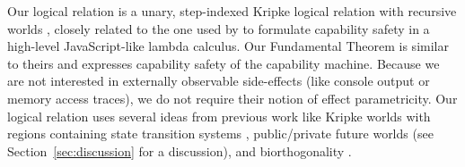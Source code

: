 \documentclass[format=acmsmall, review=true, screen=true]{acmart}
\renewcommand{\sectionname}{Section}
\newcommand\lau[1]{{\color{purple} \sf \footnotesize {LS: #1}}\\}
\renewcommand\lau[1]{}
\begin{document}

\lau{Reviewer C, esop, would like a better comparison with \citet{Devriese:2016ObjCap} (but also admits that they did not follow the below discussion).}
Our logical relation is a unary, step-indexed Kripke logical relation with
recursive worlds
\citep{pitts_operational_1998,Appel:2001:IMR:504709.504712,Ahmed2004semantics,Birkedal:2011:SKM:1926385.1926401},
closely related to the one used by \citet{Devriese:2016ObjCap} to formulate
capability safety in a high-level JavaScript-like lambda calculus. Our
Fundamental Theorem is similar to theirs and expresses capability safety of the
capability machine. Because we are not interested in externally observable
side-effects (like console output or memory access traces), we do not require
their notion of effect parametricity. Our logical relation uses several ideas
from previous work like Kripke worlds with regions containing state transition
systems \citep{Ahmed:popl09}, public/private future worlds \citep{Dreyer:jfp12}
(see \sectionname~\ref{sec:discussion} for a discussion), and biorthogonality
\citep{pitts_operational_1998,benton_biorthogonality_2009-1,Hur:2011:KLR:1926385.1926402}.
\end{document}
